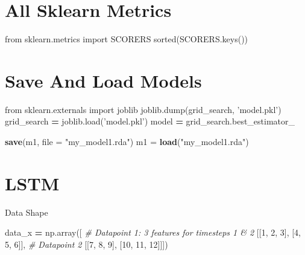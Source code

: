 \documentclass[]{book}
\newenvironment{Shaded}{\begin{snugshade}}{\end{snugshade}}
\newcommand{\KeywordTok}[1]{\textcolor[rgb]{0.13,0.29,0.53}{\textbf{#1}}}
\newcommand{\DataTypeTok}[1]{\textcolor[rgb]{0.13,0.29,0.53}{#1}}
\newcommand{\DecValTok}[1]{\textcolor[rgb]{0.00,0.00,0.81}{#1}}
\newcommand{\StringTok}[1]{\textcolor[rgb]{0.31,0.60,0.02}{#1}}
\newcommand{\ImportTok}[1]{#1}
\newcommand{\CommentTok}[1]{\textcolor[rgb]{0.56,0.35,0.01}{\textit{#1}}}
\newcommand{\OperatorTok}[1]{\textcolor[rgb]{0.81,0.36,0.00}{\textbf{#1}}}
\newcommand{\BuiltInTok}[1]{#1}
\newcommand{\NormalTok}[1]{#1}
\begin{document}
\section{All Sklearn Metrics}\label{all-sklearn-metrics}

\begin{Shaded}
\begin{Highlighting}[]
\ImportTok{from}\NormalTok{ sklearn.metrics }\ImportTok{import}\NormalTok{ SCORERS}
\BuiltInTok{sorted}\NormalTok{(SCORERS.keys())}
\end{Highlighting}
\end{Shaded}

\section{Save And Load Models}\label{save-and-load-models}

\begin{Shaded}
\begin{Highlighting}[]
\ImportTok{from}\NormalTok{ sklearn.externals }\ImportTok{import}\NormalTok{ joblib}
\NormalTok{joblib.dump(grid_search, }\StringTok{'model.pkl'}\NormalTok{)}
\NormalTok{grid_search }\OperatorTok{=}\NormalTok{ joblib.load(}\StringTok{'model.pkl'}\NormalTok{)}
\NormalTok{model }\OperatorTok{=}\NormalTok{ grid_search.best_estimator_}
\end{Highlighting}
\end{Shaded}

\begin{Shaded}
\begin{Highlighting}[]
\KeywordTok{save}\NormalTok{(m1, }\DataTypeTok{file =} \StringTok{"my_model1.rda"}\NormalTok{)}
\NormalTok{m1 =}\StringTok{ }\KeywordTok{load}\NormalTok{(}\StringTok{"my_model1.rda"}\NormalTok{)}
\end{Highlighting}
\end{Shaded}

\section{LSTM}\label{lstm}

Data Shape

\begin{Shaded}
\begin{Highlighting}[]
\NormalTok{data_x }\OperatorTok{=}\NormalTok{ np.array([}
    \CommentTok{# Datapoint 1: 3 features for timesteps 1 & 2}
\NormalTok{    [[}\DecValTok{1}\NormalTok{, }\DecValTok{2}\NormalTok{, }\DecValTok{3}\NormalTok{], [}\DecValTok{4}\NormalTok{, }\DecValTok{5}\NormalTok{, }\DecValTok{6}\NormalTok{]],}
    \CommentTok{# Datapoint 2}
\NormalTok{    [[}\DecValTok{7}\NormalTok{, }\DecValTok{8}\NormalTok{, }\DecValTok{9}\NormalTok{], [}\DecValTok{10}\NormalTok{, }\DecValTok{11}\NormalTok{, }\DecValTok{12}\NormalTok{]]])}
\end{Highlighting}
\end{Shaded}
\end{document}
